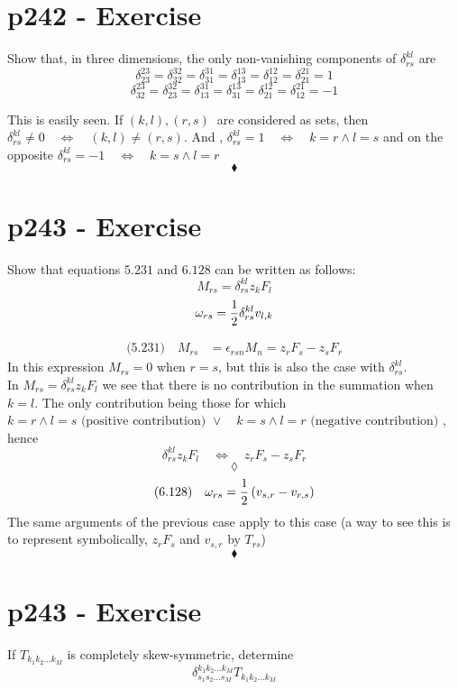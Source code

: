 \section{p242 - Exercise}
\begin{tcolorbox}
Show that, in three dimensions, the only non-vanishing components of $\delta^{kl}_{rs}$ are
$$\delta^{23}_{23}=\delta^{32}_{32}=\delta^{31}_{31}=\delta^{13}_{13}=\delta^{12}_{12}=\delta^{21}_{21}=1$$
$$\delta^{23}_{32}=\delta^{32}_{23}=\delta^{31}_{13}=\delta^{13}_{31}=\delta^{12}_{21}=\delta^{21}_{12}=-1$$
\end{tcolorbox}
This is easily seen. If $(k,l), (r, s)\ $ are considered as sets, then $\delta^{kl}_{rs}\ne 0 \quad\Leftrightarrow\quad (k,l)\ne (r, s)$.
And , $\delta^{kl}_{rs}= 1 \quad\Leftrightarrow\quad k=r \wedge l=s  $ and on the opposite $\delta^{kl}_{rs}= -1 \quad\Leftrightarrow\quad k=s \wedge l=r  $
$$\blacklozenge$$
\newpage


\section{p243 - Exercise}
\begin{tcolorbox}
Show that equations $\mathbf{5.231}$ and $\mathbf{6.128}$ can be written as follows:
$$M_{rs} = \delta^{kl}_{rs}z_kF_l$$
$$\omega_{rs} = \frac{1}{2}\delta^{kl}_{rs}v_{l,k}$$
\end{tcolorbox}
\begin{align*}
\text{(5.231)}\quad M_{rs}&=\epsilon_{rsn}M_n= z_rF_s-z_sF_r
\end{align*}
In this expression $M_{rs}=0$ when $r=s$, but this is also the case with $\delta^{kl}_{rs}$.\\
In $M_{rs} = \delta^{kl}_{rs}z_kF_l$ we see that there is no contribution in the summation when $k=l$. The only contribution being those for which $k=r \wedge l=s \text{ (positive contribution) } \vee \quad k=s \wedge l=r \text{ (negative contribution) } $, hence $$\delta^{kl}_{rs}z_kF_l\quad\Leftrightarrow\quad z_rF_s-z_sF_r$$
$$\lozenge$$
\begin{align*}
\text{(6.128)}\quad \omega_{rs} = \frac{1}{2}\left(v_{s,r}-v_{r,s}\right)
\end{align*}
The same arguments of the previous case apply to this case (a way to see this is to represent symbolically,  $z_rF_s$ and $v_{s,r}$ by $T_{rs}$)
$$\blacklozenge$$
\newpage


\section{p243 - Exercise}
\begin{tcolorbox}
If $T_{k_1k_2\dots k_M}$ is completely skew-symmetric, determine 
$$\delta^{k_1k_2\dots k_M}_{s_1s_2\dots s_M}T_{k_1k_2\dots k_M}$$
\end{tcolorbox}

